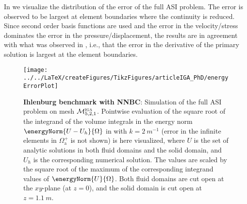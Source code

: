 In  we visualize the distribution of the error of the full ASI problem. The error is observed to be largest at element boundaries where the continuity is reduced. Since second order basis functions are used and the error in the velocity/stress dominates the error in the pressure/displacement, the results are in agreement with what was observed in \cite{Kumar2017spr}, i.e., that the error in the derivative of the primary solution is largest at the element boundaries.
\begin{figure}
	\centering
	\texttt{[image: ../../LaTeX/createFigures/TikzFigures/articleIGA\_PhD/energyErrorPlot]}
	\caption{\textbf{Ihlenburg benchmark with NNBC}: Simulation of the full ASI problem on mesh ${\cal M}_{5,2,1}^{\textsc{iga}}$. Pointwise evaluation of the square root of the integrand of the volume integrals in the energy norm $\energyNorm{U-U_h}{\Omega}$ in  with $k=\SI{2}{m^{-1}}$ (error in the infinite elements in $\Omega_{\mathrm{a}}^+$ is not shown) is here visualized, where $U$ is the set of analytic solutions in both fluid domains and the solid domain, and $U_h$ is the corresponding numerical solution. The values are scaled by the square root of the maximum of the corresponding integrand values of $\energyNorm{U}{\Omega}$. Both fluid domains are cut open at the $xy$-plane (at $z=0$), and the solid domain is cut open at $z=\SI{1.1}{m}$.}
	\label{Fig2:energyErrorPlot}
\end{figure}

